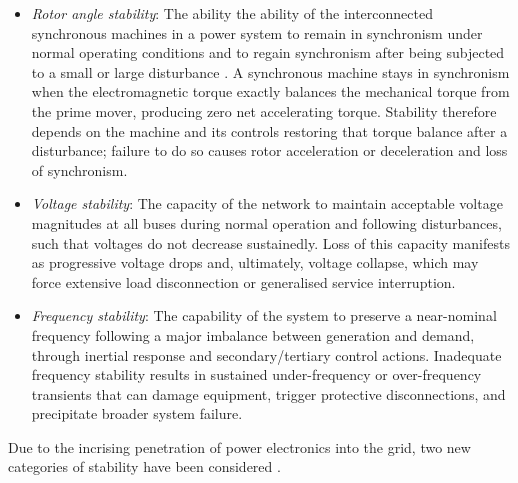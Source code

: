 \begin{itemize}
    \item \textit{Rotor angle stability}: The ability the ability of the interconnected synchronous machines in a power system 
    to remain in synchronism under normal operating conditions and to regain synchronism after being subjected to a
     small or large disturbance \cite{StabilityAndControlKundur}. A synchronous machine stays in synchronism when the 
     electromagnetic torque exactly balances the mechanical torque from the prime mover, producing zero net accelerating torque. 
     Stability therefore depends on the machine and its controls restoring that torque balance after a disturbance; failure to do 
     so causes rotor acceleration or deceleration and loss of synchronism.
    \item \textit{Voltage stability}: The capacity of the network to maintain acceptable voltage magnitudes at all buses 
    during normal operation and following disturbances, such that voltages do not decrease sustainedly. Loss of this 
    capacity manifests as progressive voltage drops and, ultimately, voltage collapse, which may force extensive load disconnection 
    or generalised service interruption.
    \item \textit{Frequency stability}: The capability of the system to preserve a near-nominal frequency following a major 
    imbalance between generation and demand, through inertial response and secondary/tertiary control actions. Inadequate frequency 
    stability results in sustained under-frequency or over-frequency transients that can damage equipment, trigger protective disconnections, 
    and precipitate broader system failure.
\end{itemize}

Due to the incrising penetration of power electronics into the grid, two new categories of stability have been considered \cite{DefStabExtended}.

